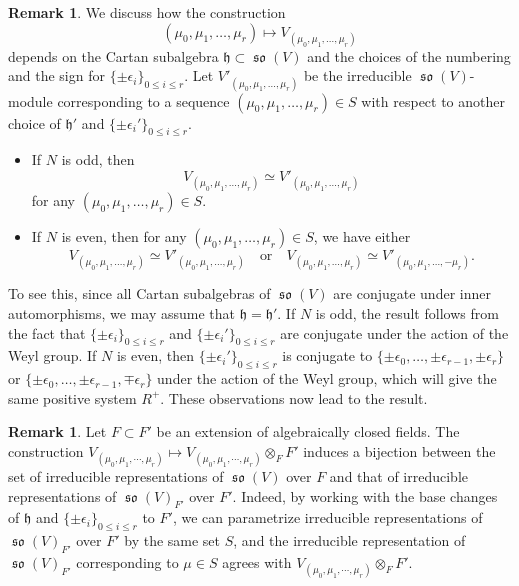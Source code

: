 \documentclass[12pt,reqno]{amsart}
\theoremstyle{definition}
\newtheorem{rem}[thm]{Remark}
\newcommand\so{\mathop{\mathfrak{so}}\nolimits}
\newcommand{\frh}{\mathfrak{h}}
\numberwithin{equation}{section}
\begin{document}
\begin{rem}\label{Remark:prameter irreducible rep}
    We discuss how the construction
    \[
    (\mu_0, \mu_1, \dotsc, \mu_r) \mapsto V_{(\mu_0, \mu_1, \dotsc, \mu_r)}
    \]
    depends on the Cartan subalgebra $\frh \subset \so(V)$
    and the choices of the numbering and the sign for $\{ \pm \epsilon_i \}_{0 \leq i \leq r}$.
    Let 
    $
    V'_{(\mu_0, \mu_1, \dotsc, \mu_r)}
    $
    be the irreducible $\so(V)$-module corresponding to 
    a sequence
    $(\mu_0, \mu_1, \dotsc, \mu_r) \in S$ with respect to another choice of $\frh'$ and $\{ \pm \epsilon_i' \}_{0 \leq i \leq r}$.
    \begin{itemize}
        \item If $N$ is odd, then
    \[
    V_{(\mu_0, \mu_1, \dotsc, \mu_r)} \simeq V'_{(\mu_0, \mu_1, \dotsc, \mu_r)}
    \]
    for any
    $(\mu_0, \mu_1, \dotsc, \mu_r) \in S$.
    \item If $N$ is even,
    then
    for any
    $(\mu_0, \mu_1, \dotsc, \mu_r) \in S$,
    we have either
    \[
    V_{(\mu_0, \mu_1, \dotsc, \mu_r)} \simeq V'_{(\mu_0, \mu_1, \dotsc, \mu_r)} \quad \text{or} \quad V_{(\mu_0, \mu_1, \dotsc, \mu_r)} \simeq V'_{(\mu_0, \mu_1, \dotsc, -\mu_r)}.
    \]
    \end{itemize}
    To see this, since all Cartan subalgebras of $\so(V)$ are conjugate under inner automorphisms, 
    we may assume that $\frh=\frh'$.
    If $N$ is odd, the result follows from the fact that $\{ \pm \epsilon_i \}_{0 \leq i \leq r}$ and $\{ \pm \epsilon_i' \}_{0 \leq i \leq r}$ are conjugate under the action of the Weyl group.
    If $N$ is even, then $\{ \pm \epsilon_i' \}_{0 \leq i \leq r}$ is conjugate to 
    $\{ \pm \epsilon_0, \ldots, \pm \epsilon_{r-1}, \pm \epsilon_r \}$ or $\{ \pm \epsilon_0, \ldots, \pm \epsilon_{r-1}, \mp \epsilon_r \}$
    under the action of the Weyl group, which will give the same positive system $R^+$.
    These observations now lead to the result.
\end{rem}











\begin{rem}\label{rem:irreducible representations invariant under algebraically closed fields extension}
	Let $F \subset F'$ be an extension of algebraically closed fields.
    The construction
    $V_{(\mu_0,\mu_1,\cdots, \mu_r)}  \mapsto V_{(\mu_0,\mu_1,\cdots, \mu_r)} \otimes_F F'$
    induces a bijection between the set of irreducible representations of $\so(V)$ over $F$ and that of irreducible representations of $\so(V)_{F'}$ over $F'$.
    Indeed, by working with the base changes
    of
    $\frh$ and $\{ \pm \epsilon_i \}_{0 \leq i \leq r}$ to $F'$,
    we can parametrize irreducible representations of $\so(V)_{F'}$ over $F'$ by the same set $S$,
    and
    the irreducible representation of
    $\so(V)_{F'}$ corresponding to $\mu \in S$
    agrees with
    $V_{(\mu_0,\mu_1,\cdots, \mu_r)} \otimes_F F'$.
	\end{rem}
\end{document}
